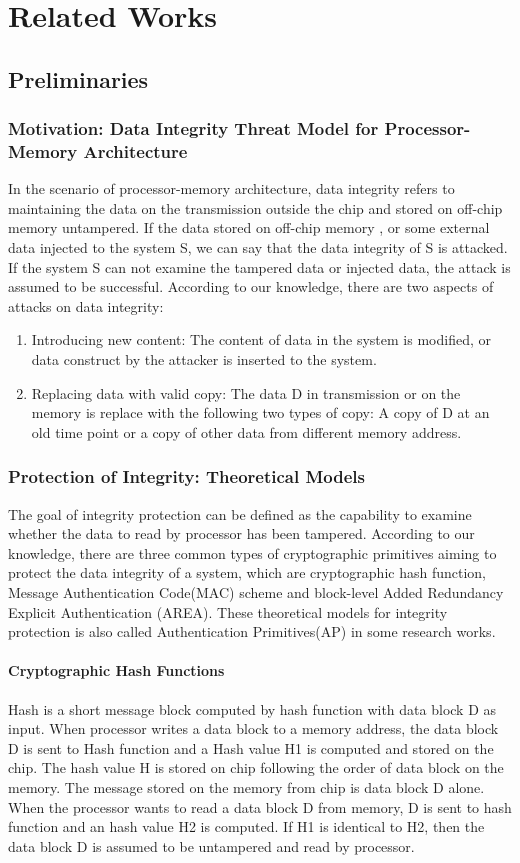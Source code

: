 \documentclass{article}
\begin{document}
\section{Related Works} 
\subsection{Preliminaries}
\subsubsection{Motivation: Data Integrity Threat Model for Processor-Memory Architecture}
In the scenario of processor-memory architecture, data integrity refers to maintaining the data on the transmission outside the chip and stored on off-chip memory untampered. If the data stored on off-chip memory , or some external data injected to the system S, we can say that the data integrity of S is attacked. If the system S can not examine the tampered data or injected data, the attack is assumed to be successful. According to our knowledge, there are two aspects of attacks on data integrity:
\begin{enumerate}
	\item Introducing new content: The content of data in the system is modified, or data construct by the attacker is inserted to the system.
	\item Replacing data with valid copy: The data D in transmission or on the memory is replace with the following two types of copy: A copy of D at an old time point or a copy of other data from different memory address.
\end{enumerate}

\subsubsection{Protection of Integrity: Theoretical Models}
The goal of integrity protection can be defined as the capability to examine whether the data to read by processor has been tampered. According to our knowledge, there are three common types of cryptographic primitives aiming to protect the data integrity of a system, which are cryptographic hash function, Message Authentication Code(MAC) scheme and block-level Added Redundancy Explicit Authentication (AREA). These theoretical models for integrity protection is also called Authentication Primitives(AP) in some research works.

\paragraph{Cryptographic Hash Functions}
Hash is a short message block computed by hash function with data block D as input.
When processor writes a data block to a memory address, the data block D is sent to Hash function and a Hash value H1 is computed and stored on the chip. The hash value H is stored on chip following the order of data block on the memory. The message stored on the memory from chip is data block D alone.
When the processor wants to read a data block D from memory, D is sent to hash function and an hash value H2 is computed. If H1 is identical to H2, then the data block D is assumed to be untampered and read by processor.
\end{document}
